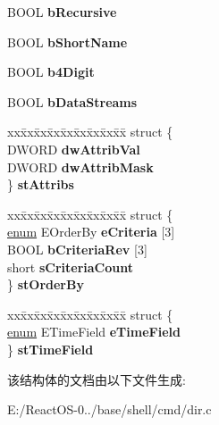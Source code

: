 \begin{DoxyCompactItemize}
B\+O\+OL {\bfseries b\+Recursive}
\item 
\mbox{\label{struct___dir_switches_flags_ac2339330d6f829b27d2fb71d26969ad7}} 
B\+O\+OL {\bfseries b\+Short\+Name}
\item 
\mbox{\label{struct___dir_switches_flags_a604b2e7ea2dbd73677b8b45aba2ed751}} 
B\+O\+OL {\bfseries b4\+Digit}
\item 
\mbox{\label{struct___dir_switches_flags_a04b0f1a754eb1bb8884df482f46b3dfa}} 
B\+O\+OL {\bfseries b\+Data\+Streams}
\item 
\mbox{\label{struct___dir_switches_flags_ae19451a1b319fe2aba38f499f1c14c89}} 
\begin{tabbing}
xx\=xx\=xx\=xx\=xx\=xx\=xx\=xx\=xx\=\kill
struct \{\\
\>DWORD {\bfseries dwAttribVal}\\
\>DWORD {\bfseries dwAttribMask}\\
\} {\bfseries stAttribs}\\

\end{tabbing}\item 
\mbox{\label{struct___dir_switches_flags_a651056d6e6b603db5410fbea1f47550d}} 
\begin{tabbing}
xx\=xx\=xx\=xx\=xx\=xx\=xx\=xx\=xx\=\kill
struct \{\\
\>\hyperlink{interfaceenum}{enum} EOrderBy {\bfseries eCriteria} \mbox{[}3\mbox{]}\\
\>BOOL {\bfseries bCriteriaRev} \mbox{[}3\mbox{]}\\
\>short {\bfseries sCriteriaCount}\\
\} {\bfseries stOrderBy}\\

\end{tabbing}\item 
\mbox{\label{struct___dir_switches_flags_a66bfccd10785dc0cfafc299375417537}} 
\begin{tabbing}
xx\=xx\=xx\=xx\=xx\=xx\=xx\=xx\=xx\=\kill
struct \{\\
\>\hyperlink{interfaceenum}{enum} ETimeField {\bfseries eTimeField}\\
\} {\bfseries stTimeField}\\

\end{tabbing}\end{DoxyCompactItemize}


该结构体的文档由以下文件生成\+:\begin{DoxyCompactItemize}
\item 
E\+:/\+React\+O\+S-\/0../base/shell/cmd/dir.\+c\end{DoxyCompactItemize}

